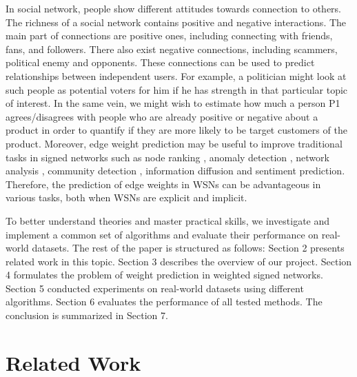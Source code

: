 \documentclass{article}
\begin{document}
In social network, people show different attitudes towards 
connection to others. The richness of a social network contains 
positive and negative interactions. The main part of connections 
are positive ones, including connecting with friends, fans, and
followers. There also exist negative connections, including 
scammers, political enemy and opponents. These connections can 
be used to predict relationships between independent users. 
For example, a politician might look at such people as potential 
voters for him if he has strength in that particular topic of 
interest. In the same vein, we might wish to estimate how much 
a person P1 agrees/disagrees with people who are already 
positive or negative about a product in order to quantify if 
they are more likely to be target customers of the product. 
Moreover, edge weight prediction may be useful to improve 
traditional tasks in signed networks such as node ranking
\cite{shahriari2014ranking}, anomaly detection\cite{Kmumar2014}
\cite{Wu:2016:TMR:2835776.2835816}, network 
analysis\cite{Kumar:2016:SDS:2872518.2889391}
\cite{leskovec2010signed}, community detection
\cite{PhysRevE.80.036115}, information diffusion
\cite{Shafaei_2014} \cite{Li2014} and sentiment 
prediction\cite{west2014}. Therefore, the prediction of edge 
weights in WSNs can be advantageous in various tasks, both 
when WSNs are explicit and implicit.

To better understand theories and master practical skills, 
we investigate and implement a common set of algorithms and 
evaluate their performance on real-world datasets. 
The rest of the paper is structured as follows: Section 2 
presents related work in this topic. Section 3 describes the 
overview of our project. Section 4 formulates the problem of 
weight prediction in weighted signed networks. Section 5 
conducted experiments on real-world datasets using different 
algorithms. Section 6 evaluates the performance of all tested 
methods. The conclusion is summarized in Section 7.

\section{Related Work}
\end{document}
